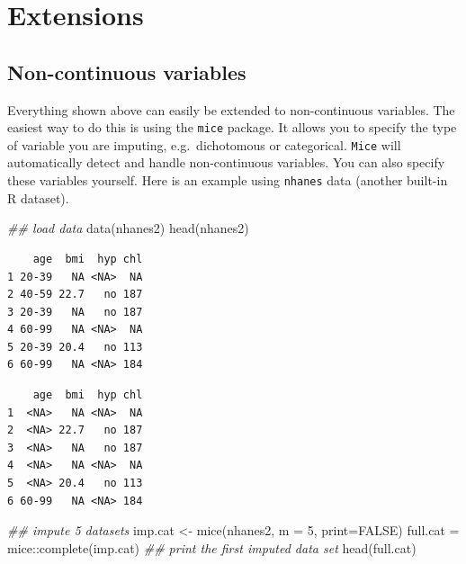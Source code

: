 \documentclass[
  letterpaper,
  DIV=11,
  numbers=noendperiod]{scrreprt}
\newenvironment{Shaded}{}{}
\newcommand{\AttributeTok}[1]{\textcolor[rgb]{0.49,0.56,0.16}{#1}}
\newcommand{\ConstantTok}[1]{\textcolor[rgb]{0.53,0.00,0.00}{#1}}
\newcommand{\DecValTok}[1]{\textcolor[rgb]{0.25,0.63,0.44}{#1}}
\newcommand{\DocumentationTok}[1]{\textcolor[rgb]{0.73,0.13,0.13}{\textit{#1}}}
\newcommand{\FunctionTok}[1]{\textcolor[rgb]{0.02,0.16,0.49}{#1}}
\newcommand{\NormalTok}[1]{#1}
\newcommand{\OtherTok}[1]{\textcolor[rgb]{0.00,0.44,0.13}{#1}}
\newcommand{\SpecialCharTok}[1]{\textcolor[rgb]{0.25,0.44,0.63}{#1}}
\begin{document}
\section{Extensions}\label{extensions}

\subsection{Non-continuous variables}\label{non-continuous-variables}

Everything shown above can easily be extended to non-continuous
variables. The easiest way to do this is using the \texttt{mice}
package. It allows you to specify the type of variable you are imputing,
e.g.~dichotomous or categorical. \texttt{Mice} will automatically detect
and handle non-continuous variables. You can also specify these
variables yourself. Here is an example using \texttt{nhanes} data
(another built-in R dataset).

\begin{Shaded}
\begin{Highlighting}[]
\DocumentationTok{\#\# load data }
  \FunctionTok{data}\NormalTok{(nhanes2)}
  \FunctionTok{head}\NormalTok{(nhanes2)}
\end{Highlighting}
\end{Shaded}

\begin{verbatim}
    age  bmi  hyp chl
1 20-39   NA <NA>  NA
2 40-59 22.7   no 187
3 20-39   NA   no 187
4 60-99   NA <NA>  NA
5 20-39 20.4   no 113
6 60-99   NA <NA> 184
\end{verbatim}

\begin{Shaded}
\end{Shaded}

\begin{verbatim}
    age  bmi  hyp chl
1  <NA>   NA <NA>  NA
2  <NA> 22.7   no 187
3  <NA>   NA   no 187
4  <NA>   NA <NA>  NA
5  <NA> 20.4   no 113
6 60-99   NA <NA> 184
\end{verbatim}

\begin{Shaded}
\begin{Highlighting}[]
\DocumentationTok{\#\# impute 5 datasets }
\NormalTok{  imp.cat }\OtherTok{\textless{}{-}} \FunctionTok{mice}\NormalTok{(nhanes2, }\AttributeTok{m =} \DecValTok{5}\NormalTok{, }\AttributeTok{print=}\ConstantTok{FALSE}\NormalTok{)     }
\NormalTok{  full.cat }\OtherTok{=}\NormalTok{ mice}\SpecialCharTok{::}\FunctionTok{complete}\NormalTok{(imp.cat)           }\DocumentationTok{\#\# print the first imputed data set}
  \FunctionTok{head}\NormalTok{(full.cat)}
\end{Highlighting}
\end{Shaded}
\end{document}
